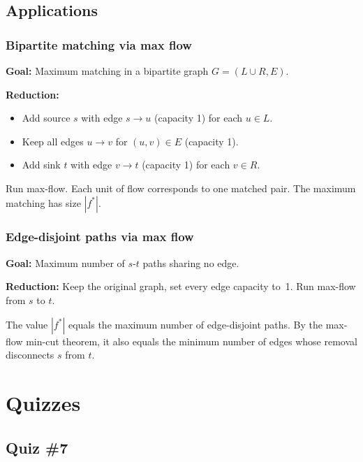 \documentclass[11pt,a4paper,openany]{book}
\begin{document}
\section{Applications}

\subsection{Bipartite matching via max flow}

\begin{thmbox}[title=Algorithm]
\textbf{Goal:} Maximum matching in a bipartite graph $G = (L \cup R, E)$.

\textbf{Reduction:}
\begin{itemize}
  \item Add source $s$ with edge $s \to u$ (capacity 1) for each $u \in L$.
  \item Keep all edges $u \to v$ for $(u,v) \in E$ (capacity 1).
  \item Add sink $t$ with edge $v \to t$ (capacity 1) for each $v \in R$.
\end{itemize}

Run max-flow. Each unit of flow corresponds to one matched pair.
The maximum matching has size $|f^*|$.
\end{thmbox}

\subsection{Edge-disjoint paths via max flow}

\begin{thmbox}[title=Algorithm]
\textbf{Goal:} Maximum number of $s$-$t$ paths sharing no edge.

\textbf{Reduction:} Keep the original graph, set every edge capacity to~1.
Run max-flow from $s$ to $t$.

The value $|f^*|$ equals the maximum number of edge-disjoint paths.
By the max-flow min-cut theorem, it also equals the minimum number of edges whose
removal disconnects $s$ from $t$.
\end{thmbox}


\chapter{Quizzes}

\section{Quiz \#7}
\end{document}
